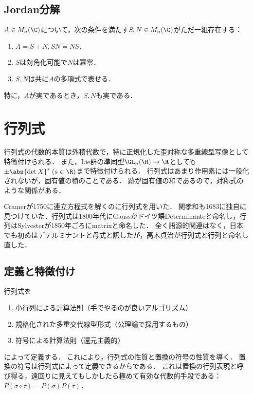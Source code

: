 \documentclass[uplatex, dvipdfmx]{jsreport}
\begin{document}
\subsection{Jordan分解}

\begin{theorem}
    $A\in M_n(\C)$について，次の条件を満たす$S,N\in M_n(\C)$がただ一組存在する：
    \begin{enumerate}
        \item $A=S+N,SN=NS$．
        \item $S$は対角化可能で$N$は冪零．
        \item $S,N$は共に$A$の多項式で表せる．
    \end{enumerate}
    特に，$A$が実であるとき，$S,N$も実である．
\end{theorem}

\section{行列式}

\begin{tcolorbox}[colframe=ForestGreen, colback=ForestGreen!10!white,breakable,colbacktitle=ForestGreen!40!white,coltitle=black,fonttitle=\bfseries\sffamily,
title=]
    行列式の代数的本質は外積代数で，特に正規化した歪対称な多重線型写像として特徴付けられる．
    また，Lie群の準同型$\GL_n(\R)\to\R$としても$\pm\abs{\det X}^s\;(s\in\R)$まで特徴付けられる．
    行列式はあまり作用素には一般化されないが，固有値の積のことである．
    跡が固有値の和であるので，対称式のような関係がある．
\end{tcolorbox}

\begin{history}
    Cramerが1750に連立方程式を解くのに行列式を用いた．
    関孝和も1683に独自に見つけていた．行列式は1800年代にGaussがドイツ語Determinanteと命名し，行列はSylvesterが1850年ごろにmatrixと命名した．
    全く語源的関連はなく，日本でも初めはデテルミナントと母式と訳したが，高木貞治が行列式と行列と命名し直した．
\end{history}

\subsection{定義と特徴付け}

\begin{tcolorbox}[colframe=ForestGreen, colback=ForestGreen!10!white, breakable]
    行列式を
    \begin{enumerate}
        \item 小行列による計算法則（手でやるのが良いアルゴリズム）
        \item 規格化された多重交代線型形式（公理論で採用するもの）
        \item 符号による計算法則（還元主義的）
    \end{enumerate}
    によって定義する．
    これにより，行列式の性質と置換の符号の性質を導く．
    置換の符号は行列式によって定義できるからである．
    これは置換の行列表現と呼び得る，遠回りに見えてもしかしたら極めて有効な代数的手段である：$P(\sigma\circ\tau)=P(\sigma)P(\tau)$．
\end{tcolorbox}
\end{document}
